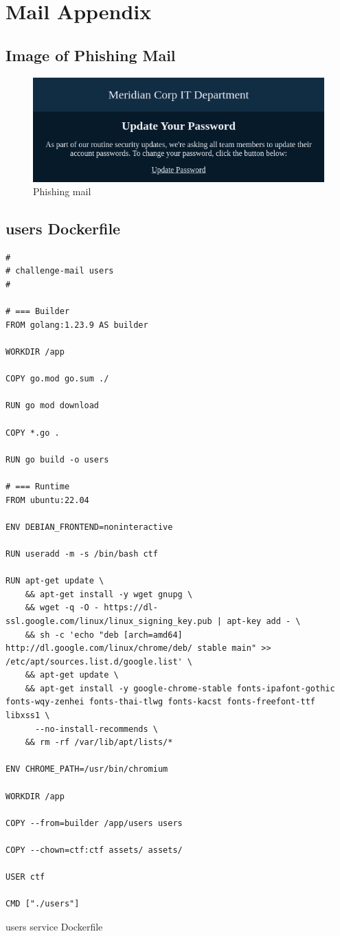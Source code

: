 \section{Mail Appendix}

\subsection{Image of Phishing Mail}\label{apx:challenge-mail-handout}

\begin{figure}[H]
    \includegraphics[width=1\linewidth]{img/phishing-mail.png}
    \caption{Phishing mail}
    \label{fig:component-diagram}
\end{figure}

\subsection{users Dockerfile}\label{apx:users-dockerfile}

\begin{verbatim}
#
# challenge-mail users
# 

# === Builder
FROM golang:1.23.9 AS builder

WORKDIR /app

COPY go.mod go.sum ./

RUN go mod download

COPY *.go .

RUN go build -o users

# === Runtime
FROM ubuntu:22.04

ENV DEBIAN_FRONTEND=noninteractive

RUN useradd -m -s /bin/bash ctf

RUN apt-get update \
    && apt-get install -y wget gnupg \
    && wget -q -O - https://dl-ssl.google.com/linux/linux_signing_key.pub | apt-key add - \
    && sh -c 'echo "deb [arch=amd64] http://dl.google.com/linux/chrome/deb/ stable main" >> /etc/apt/sources.list.d/google.list' \
    && apt-get update \
    && apt-get install -y google-chrome-stable fonts-ipafont-gothic fonts-wqy-zenhei fonts-thai-tlwg fonts-kacst fonts-freefont-ttf libxss1 \
      --no-install-recommends \
    && rm -rf /var/lib/apt/lists/*

ENV CHROME_PATH=/usr/bin/chromium

WORKDIR /app

COPY --from=builder /app/users users

COPY --chown=ctf:ctf assets/ assets/

USER ctf

CMD ["./users"]
\end{verbatim}
\begin{listing}[H]
    \caption{users service Dockerfile}
\end{listing}